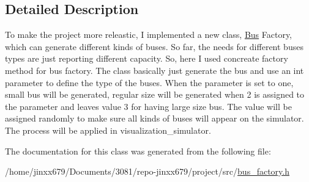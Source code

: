 \subsection{Detailed Description}
To make the project more releastic, I implemented a new class, \hyperlink{classBus}{Bus} Factory, which can generate different kinds of buses. So far, the needs for different buses types are just reporting different capacity. So, here I used concreate factory method for bus factory. The class basically just generate the bus and use an int parameter to define the type of the buses. When the parameter is set to one, small bus will be generated, regular size will be generated when 2 is assigned to the parameter and leaves value 3 for having large size bus. The value will be assigned randomly to make sure all kinds of buses will appear on the simulator. The process will be applied in visualization\+\_\+simulator. 

The documentation for this class was generated from the following file\+:\begin{DoxyCompactItemize}
\item 
/home/jinxx679/\+Documents/3081/repo-\/jinxx679/project/src/\hyperlink{bus__factory_8h}{bus\+\_\+factory.\+h}\end{DoxyCompactItemize}
